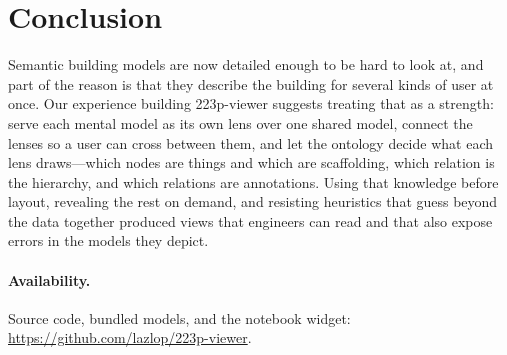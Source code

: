 \documentclass[10pt,twocolumn]{article}
\begin{document}
\section{Conclusion}

Semantic building models are now detailed enough to be hard to look at, and part
of the reason is that they describe the building for several kinds of user at
once. Our experience building 223p-viewer suggests treating that as a strength:
serve each mental model as its own lens over one shared model, connect the lenses
so a user can cross between them, and let the ontology decide what each lens
draws---which nodes are things and which are scaffolding, which relation is the
hierarchy, and which relations are annotations. Using that knowledge before layout,
revealing the rest on demand, and resisting heuristics that guess beyond the data
together produced views that engineers can read and that also expose errors in the
models they depict.

\paragraph{Availability.}
Source code, bundled models, and the notebook widget:
\url{https://github.com/lazlop/223p-viewer}.



\end{document}
